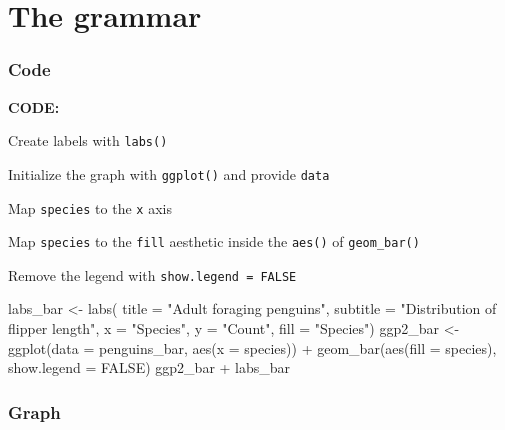 \documentclass[
  letterpaper,
  DIV=11,
  numbers=noendperiod,
  oneside]{scrreprt}
\newenvironment{Shaded}{\begin{snugshade}}{\end{snugshade}}
\newcommand{\AttributeTok}[1]{\textcolor[rgb]{0.40,0.45,0.13}{#1}}
\newcommand{\ConstantTok}[1]{\textcolor[rgb]{0.56,0.35,0.01}{#1}}
\newcommand{\FunctionTok}[1]{\textcolor[rgb]{0.28,0.35,0.67}{#1}}
\newcommand{\NormalTok}[1]{\textcolor[rgb]{0.00,0.23,0.31}{#1}}
\newcommand{\OtherTok}[1]{\textcolor[rgb]{0.00,0.23,0.31}{#1}}
\newcommand{\SpecialCharTok}[1]{\textcolor[rgb]{0.37,0.37,0.37}{#1}}
\newcommand{\StringTok}[1]{\textcolor[rgb]{0.13,0.47,0.30}{#1}}
\begin{document}
\hypertarget{the-grammar}{%
\section*{The grammar}\label{the-grammar}}

\hypertarget{code-1}{%
\subsubsection*{Code}\label{code-1}}

\textbf{CODE:}

Create labels with \texttt{labs()}

Initialize the graph with \texttt{ggplot()} and provide \texttt{data}

Map \texttt{species} to the \texttt{x} axis

Map \texttt{species} to the \texttt{fill} aesthetic inside the
\texttt{aes()} of \texttt{geom\_bar()}

Remove the legend with \texttt{show.legend\ =\ FALSE}

\begin{Shaded}
\begin{Highlighting}[]
\NormalTok{labs\_bar }\OtherTok{\textless{}{-}} \FunctionTok{labs}\NormalTok{(}
  \AttributeTok{title =} \StringTok{"Adult foraging penguins"}\NormalTok{,}
  \AttributeTok{subtitle =} \StringTok{"Distribution of flipper length"}\NormalTok{,}
  \AttributeTok{x =} \StringTok{"Species"}\NormalTok{, }\AttributeTok{y =} \StringTok{"Count"}\NormalTok{, }
  \AttributeTok{fill =} \StringTok{"Species"}\NormalTok{)}
\NormalTok{ggp2\_bar }\OtherTok{\textless{}{-}} \FunctionTok{ggplot}\NormalTok{(}\AttributeTok{data =}\NormalTok{ penguins\_bar,}
       \FunctionTok{aes}\NormalTok{(}\AttributeTok{x =}\NormalTok{ species)) }\SpecialCharTok{+}
    \FunctionTok{geom\_bar}\NormalTok{(}\FunctionTok{aes}\NormalTok{(}\AttributeTok{fill =}\NormalTok{ species), }
        \AttributeTok{show.legend =} \ConstantTok{FALSE}\NormalTok{)}
\NormalTok{ggp2\_bar }\SpecialCharTok{+}
\NormalTok{  labs\_bar}
\end{Highlighting}
\end{Shaded}

\hypertarget{graph-1}{%
\subsubsection*{Graph}\label{graph-1}}
\end{document}
